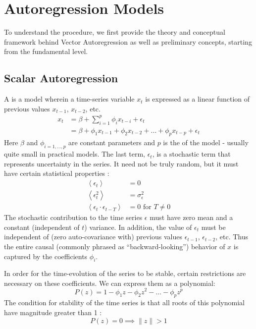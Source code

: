 \section{Autoregression Models} \label{sec:theory}
\newcommand{\vect}[1]{\boldsymbol{#1}}
\newcommand{\expc}[1]{\left< #1 \right>}

To understand the procedure, we first provide the theory and conceptual 
framework behind Vector Autoregression as well as preliminary concepts, 
starting from the fundamental level.

\subsection{Scalar Autoregression} \label{sec:armodel}

    A  is a model wherein a time-series variable $x_t$
    is expressed as a linear function of previous values $x_{t-1}$, $x_{t-2}$, etc.
    \begin{align} \label{eq:ardef}
        x_t 
        &= \beta + \sum_{i=1}^p \phi_i x_{t-i} + \epsilon_t \\
        &= \beta + \phi_1 x_{t-1} + \phi_2 x_{t-2} + \ldots + \phi_p x_{t-p} + \epsilon_t
    \end{align}
    Here $\beta$ and $\phi_{i=1,\ldots,p}$ are constant parameters and 
    $p$ is the  of the model - usually quite small in practical 
    models.  The last term, $\epsilon_t$, is a stochastic term that represents
    uncertainty in the series.  It need not be truly random, but it must have 
    certain statistical properties \cite{zivot}:
    \begin{align} 
        \label{eq:stochastic1} \expc{\epsilon_t} &= 0 \\
        \label{eq:stochastic2}  \expc{\epsilon_t^2} &= \sigma_\epsilon^2 \\
        \label{eq:stochastic3} \expc{\epsilon_t \cdot \epsilon_{t-T}} &= 0 \text{ for } T \neq 0
    \end{align}
    The stochastic contribution to the time series $\epsilon$ must have zero 
    mean and a constant (independent of $t$) variance.  In addition, the value
    of $\epsilon_t$ must be independent of (zero auto-covariance with) previous values
    $\epsilon_{t-1}$, $\epsilon_{t-2}$, etc.  Thus the entire causal (commonly 
    phrased as ``backward-looking'') behavior of $x$ is captured by the 
    coefficients $\phi_i$.
    
    In order for the time-evolution of the series to be stable, certain 
    restrictions are necessary on these coefficients.  
    We can express them as a polynomial:
    \begin{equation} \label{eq:arpoly}
        P(z) = 1 - \phi_1 z - \phi_2 z^2 - \ldots - \phi_p z^p 
    \end{equation}
    The condition for stability of the time series is that all roots of this 
    polynomial have magnitude greater than 1 \cite{zivot}:
    \begin{equation} \label{eq:arstability}
        P(z) = 0 \implies \| z \| > 1 
    \end{equation}
    
